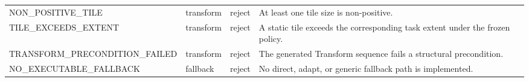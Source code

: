 \begin{table}[htbp]
\begin{tabular}{p{}p{}p{}p{}}
    NON\_POSITIVE\_TILE & transform & reject & At least one tile size is non-positive. \\
    TILE\_EXCEEDS\_EXTENT & transform & reject & A static tile exceeds the corresponding task extent under the frozen policy. \\
    TRANSFORM\_PRECONDITION\_FAILED & transform & reject & The generated Transform sequence fails a structural precondition. \\
    NO\_EXECUTABLE\_FALLBACK & fallback & reject & No direct, adapt, or generic fallback path is implemented. \\
    \bottomrule
  \end{tabular}
\end{table}
